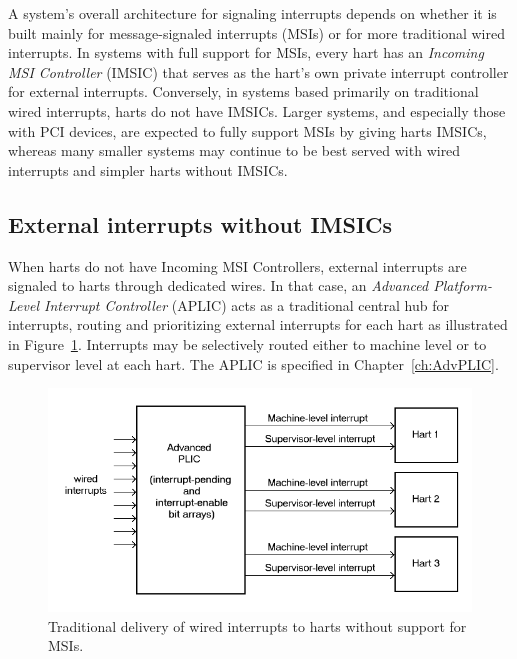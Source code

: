 A {\RISCV} system's overall architecture for signaling interrupts
depends on whether it is built mainly for message-signaled interrupts
(MSIs) or for more traditional wired interrupts.
In systems with full support for MSIs, every hart has an
\emph{Incoming MSI Controller} (IMSIC) that serves as the hart's own
private interrupt controller for external interrupts.
Conversely, in systems based primarily on traditional wired interrupts,
harts do not have IMSICs.
Larger systems, and especially those with PCI devices, are
expected to fully support MSIs by giving harts IMSICs, whereas many
smaller systems may continue to be best served with wired interrupts
and simpler harts without IMSICs.

\subsection{External interrupts without IMSICs}

When {\RISCV} harts do not have Incoming MSI Controllers, external
interrupts are signaled to harts through dedicated wires.
In that case, an \emph{Advanced Platform-Level Interrupt Controller}
(APLIC) acts as a traditional central hub for interrupts,
routing and prioritizing external interrupts for each hart as
illustrated in Figure~\ref{fig:intrsWithoutIMSICs}.
Interrupts may be selectively routed either to machine level or to
supervisor level at each hart.
The APLIC is specified in Chapter~\ref{ch:AdvPLIC}.

\begin{figure}[th]
\centerline{\includegraphics[scale=0.55]{intrsWithoutIMSICs.png}}
\caption{%
Traditional delivery of wired interrupts to harts without support for
MSIs.%
}
\label{fig:intrsWithoutIMSICs}
\end{figure}

